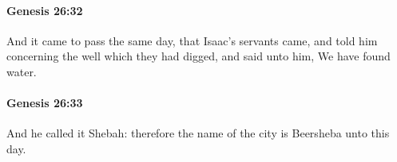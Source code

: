 		\paragraph{Genesis 26:32} %
			\label{GENESIS-26-32}

			And it came to pass the same day, that Isaac's servants came, and told him concerning the well which they had digged, and said unto him, We have found water.


		\paragraph{Genesis 26:33} %
			\label{GENESIS-26-33}

			And he called it Shebah: therefore the name of the city is Beersheba unto this day.


